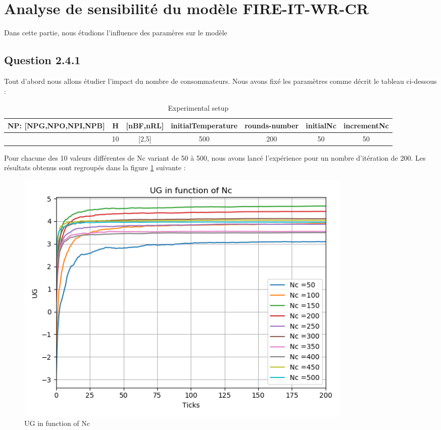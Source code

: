 \section{Analyse de sensibilité du modèle FIRE-IT-WR-CR}
Dans cette partie, nous étudions l'influence des paramères sur le modèle
\subsection{Question 2.4.1}
Tout d'abord nous allons étudier l'impact du nombre de consommateurs. Nous avons fixé les paramètres comme décrit le tableau ci-dessous :

\begin{table}[H]
    \centering
    \begin{tabular}{|c|c|c|c|c|c|c|}
    \hline
         NP: [NPG,NPO,NPI,NPB] & H & [nBF,nRL] & initialTemperature & rounds-number & initialNc & incrementNc\\ \hline
         [10,40,5,45] & 10 & [2,5] & 500 & 200 & 50 & 50\\\hline
    \end{tabular}
    \caption{Experimental setup}
    \label{tab:Experimental setup1}
\end{table}

Pour chacune des 10 valeurs différentes de Nc variant de 50 à 500, nous avons lancé l'expérience pour un nombre d'itération de 200. Les résultats obtenus sont regroupés dans la figure \ref{fig:UGNc} suivante :

\begin{figure}[H]
\centering
\captionsetup{justification=centering}
\includegraphics[width=0.8\textwidth]{images/UGinfunctionNc.png}
\caption{UG in function of Nc}
\label{fig:UGNc}
\end{figure}

